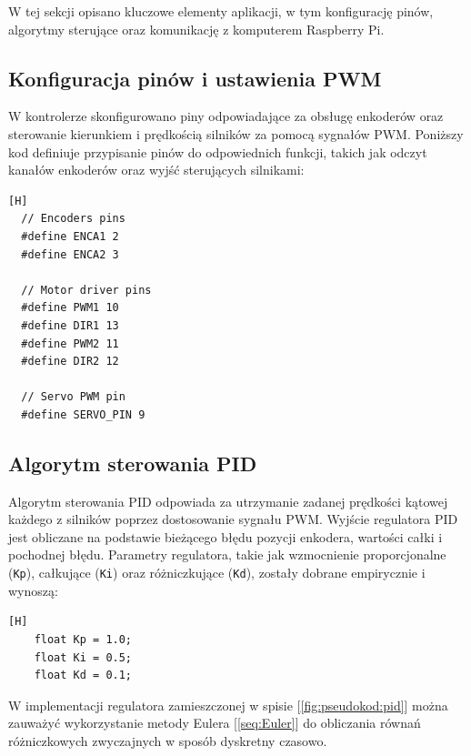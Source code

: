 W tej sekcji opisano kluczowe elementy aplikacji, w tym konfigurację pinów, algorytmy sterujące oraz komunikację z komputerem Raspberry Pi.

\subsection{Konfiguracja pinów i ustawienia PWM}

W kontrolerze skonfigurowano piny odpowiadające za obsługę enkoderów oraz sterowanie kierunkiem i prędkością silników za pomocą sygnałów PWM. Poniższy kod definiuje przypisanie pinów do odpowiednich funkcji, takich jak odczyt kanałów enkoderów oraz wyjść sterujących silnikami:

\vspace*{0.5cm}

\begin{lstlisting}[caption=Fragment przedstawiający konfigurację pinów, label=lst:config, captionpos=b][H]
  // Encoders pins
  #define ENCA1 2 
  #define ENCA2 3 
  
  // Motor driver pins
  #define PWM1 10
  #define DIR1 13
  #define PWM2 11
  #define DIR2 12
  
  // Servo PWM pin
  #define SERVO_PIN 9
\end{lstlisting}


\subsection{Algorytm sterowania PID}

Algorytm sterowania PID odpowiada za utrzymanie zadanej prędkości kątowej każdego z silników poprzez dostosowanie sygnału PWM. Wyjście regulatora PID jest obliczane na podstawie bieżącego błędu pozycji enkodera, wartości całki i pochodnej błędu. Parametry regulatora, takie jak wzmocnienie proporcjonalne (\texttt{Kp}), całkujące (\texttt{Ki}) oraz różniczkujące (\texttt{Kd}), zostały dobrane empirycznie i wynoszą:

\vspace*{0.5cm}


\begin{lstlisting}[caption=Wartości parametrów regulatora PID, label=fig:pseudokod:pid, captionpos=b][H]
    float Kp = 1.0; 
    float Ki = 0.5; 
    float Kd = 0.1; 
\end{lstlisting}

\vspace*{0.5cm}


W implementacji regulatora zamieszczonej w spisie [\ref{fig:pseudokod:pid}] można zauważyć wykorzystanie metody Eulera [\ref{seq:Euler}] do obliczania równań różniczkowych zwyczajnych w sposób dyskretny czasowo. 

